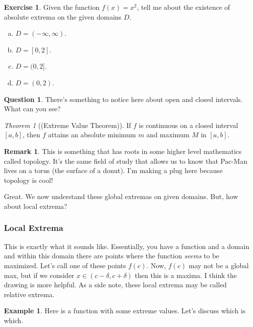 \documentclass[leqno]{article}
\theoremstyle{definition}
\newtheorem{remark}{Remark}[section]
\newtheorem{example}{Example}[section]
\newtheorem{question}{Question}[section]
\newtheorem{exercise}{Exercise}[section]
\theoremstyle{remark}
\theoremstyle{theorem}
\newtheorem{theorem}{Theorem}[section]
\begin{document}
\begin{exercise}
Given the function $f(x)=x^2$, tell me about the existence of absolute extrema on the given domains $D$.
\begin{enumerate}[(a)]
\item $D=(-\infty,\infty)$. 
\item $D=[0,2]$.
\item $D=(0,2]$.
\item $D=(0,2)$.
\end{enumerate}
\vspace*{5cm}
\end{exercise}

\begin{question}
There's something to notice here about open and closed intervals.  What can you see?
\vspace*{4cm}
\end{question}

\begin{theorem}[(Extreme Value Theorem)]
If $f$ is continuous on a closed interval $[a,b]$, then $f$ attains an absolute minimum $m$ and maximum $M$ in $[a,b]$.
\end{theorem}

\begin{remark}
This is something that has roots in some higher level mathematics called topology.  It's the same field of study that allows us to know that Pac-Man lives on a torus (the surface of a donut). I'm making a plug here because topology is cool!
\end{remark}

Great. We now understand these global extremas on given domains.  But, how about local extrema?

\subsubsection{Local Extrema}

This is exactly what it sounds like.  Essentially, you have a function and a domain and within this domain there are points where the function \emph{seems} to be maximized.  Let's call one of these points $f(c)$. Now, $f(c)$ may not be a global max, but if we consider $x\in (c-\delta,c+\delta)$ then this is a maxima. I think the drawing is more helpful. As a side note, these local extrema may be called relative extrema.

\begin{example}
Here is a function with some extreme values. Let's discuss which is which.
\vspace*{6cm}
\end{example}
\end{document}

